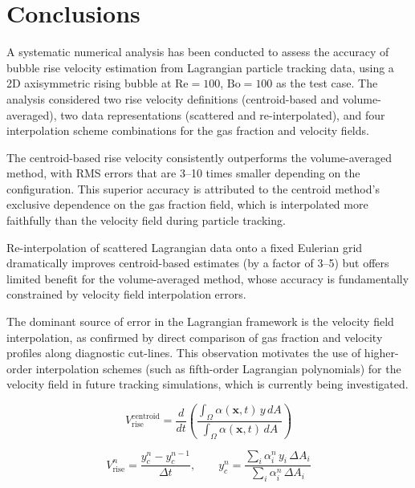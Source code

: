 \documentclass[11pt,a4paper]{article}
\begin{document}
\section{Conclusions}\label{sec:conclusions}

A systematic numerical analysis has been conducted to assess the accuracy of
bubble rise velocity estimation from Lagrangian particle tracking data,
using a 2D axisymmetric rising bubble at $\mathrm{Re}=100$,
$\mathrm{Bo}=100$ as the test case.  The analysis considered two rise
velocity definitions (centroid-based and volume-averaged), two data
representations (scattered and re-interpolated), and four interpolation
scheme combinations for the gas fraction and velocity fields.

The centroid-based rise velocity consistently outperforms the
volume-averaged method, with RMS errors that are 3--10 times smaller
depending on the configuration.  This superior accuracy is attributed to the
centroid method's exclusive dependence on the gas fraction field, which is
interpolated more faithfully than the velocity field during particle
tracking.

Re-interpolation of scattered Lagrangian data onto a fixed Eulerian grid
dramatically improves centroid-based estimates (by a factor of 3--5) but
offers limited benefit for the volume-averaged method, whose accuracy is
fundamentally constrained by velocity field interpolation errors.

The dominant source of error in the Lagrangian framework is the velocity
field interpolation, as confirmed by direct comparison of gas fraction and
velocity profiles along diagnostic cut-lines.  This observation motivates
the use of higher-order interpolation schemes (such as fifth-order
Lagrangian polynomials) for the velocity field in future tracking
simulations, which is currently being investigated.





\begin{equation}\label{eq:centroid}
	V_{\text{rise}}^{\text{centroid}} = \frac{d}{dt} \left( \frac{\int_\Omega \alpha(\mathbf{x},t) \, y \, dA}{\int_\Omega \alpha(\mathbf{x},t) \, dA} \right)
\end{equation}

\begin{equation}\label{eq:centroid_disc}
	V_{\text{rise}}^{n} = \frac{y_c^{n} - y_c^{n-1}}{\Delta t}, \qquad y_c^{n} = \frac{\sum_i \alpha_i^{n} \, y_i \, \Delta A_i}{\sum_i \alpha_i^{n} \, \Delta A_i}
\end{equation}
\end{document}
